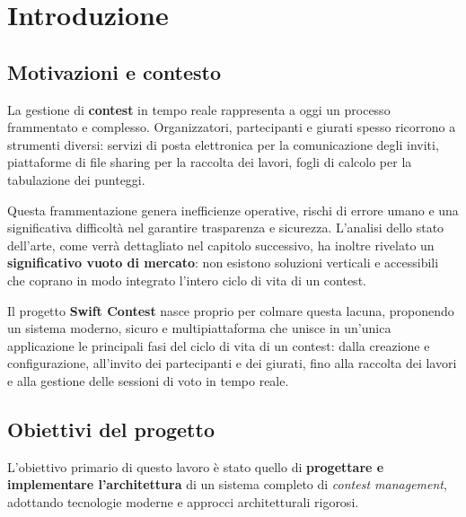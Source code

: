
\chapter{Introduzione}\label{ch:introduzione}


\section{Motivazioni e contesto}\label{sec:motivazioni-e-contesto}
La gestione di \textbf{contest} in tempo reale rappresenta a oggi un processo frammentato e complesso.
Organizzatori, partecipanti e giurati spesso ricorrono a strumenti diversi: servizi di posta elettronica per la comunicazione degli inviti, piattaforme di file sharing per la raccolta dei lavori, fogli di calcolo per la tabulazione dei punteggi.

Questa frammentazione genera inefficienze operative, rischi di errore umano e una significativa difficoltà nel garantire trasparenza e sicurezza.
L'analisi dello stato dell'arte, come verrà dettagliato nel capitolo successivo, ha inoltre rivelato un \textbf{significativo vuoto di mercato}: non esistono soluzioni verticali e accessibili che coprano in modo integrato l'intero ciclo di vita di un contest.

Il progetto \textbf{Swift Contest} nasce proprio per colmare questa lacuna, proponendo un sistema moderno, sicuro e multipiattaforma che unisce in un'unica applicazione le principali fasi del ciclo di vita di un contest: dalla creazione e configurazione, all’invito dei partecipanti e dei giurati, fino alla raccolta dei lavori e alla gestione delle sessioni di voto in tempo reale.

\section{Obiettivi del progetto}\label{sec:obiettivi-del-progetto}
L’obiettivo primario di questo lavoro è stato quello di \textbf{progettare e implementare l'architettura} di un sistema completo di \emph{contest management}, adottando tecnologie moderne e approcci architetturali rigorosi.

